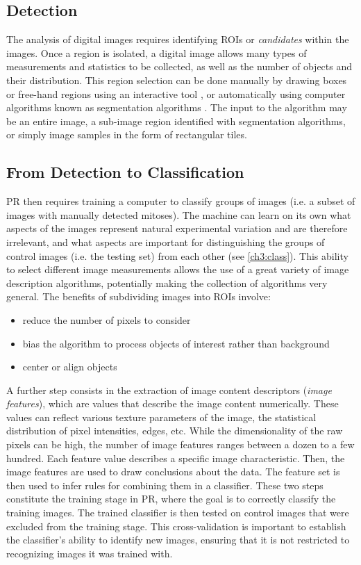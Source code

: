 \subsection{Detection}

The analysis of digital images requires identifying \Glspl{ROI} or \textit{candidates} within the images. Once a region is isolated,
a digital image allows many types of measurements and statistics to be collected, as well as the number of objects and their distribution.
This region selection can be done manually by drawing boxes or free-hand regions using an
interactive tool \cite{swedlow2009bioimage}, or automatically using
computer algorithms known as segmentation algorithms \cite{ljosa2009introduction}.
The input to the algorithm may be an entire image, a sub-image region identified with segmentation algorithms, or simply image samples
in the form of rectangular tiles.

\subsection{From Detection to Classification}

\Gls{PR} then requires training a computer to classify groups of images (i.e. a subset of images with manually detected mitoses).
The machine can learn on its own what aspects of the images represent natural experimental variation and are
therefore irrelevant, and what aspects are important for distinguishing the groups of
control images (i.e. the testing set) from each other (see \ref{ch3:class}).
This ability to select different image measurements  allows the use of a great
variety of image description algorithms, potentially making the collection of algorithms very general.
The benefits of subdividing images into \Glspl{ROI} involve:

\begin{itemize}
 \item reduce the number of pixels to consider
 \item bias the algorithm to process objects of interest rather than background
 \item center or align objects
\end{itemize}

A further step consists in the extraction of image content descriptors (\textit{image features}),
which are values that describe the image content numerically. These values can
reflect various texture parameters of the image, the statistical distribution of pixel intensities, edges, etc.
While the dimensionality of the raw pixels can be high, the number of image features ranges
between a dozen to a few hundred. Each feature value describes a specific image characteristic.
Then, the image features are used to draw conclusions about the data.
The feature set is then used to infer rules for combining them in a classifier.
These two steps constitute the training stage in PR, where the goal is to correctly
classify the training images. The trained classifier is then tested on control images
that were excluded from the training stage.
This cross-validation is important to establish the classifier's ability to identify
new images, ensuring that it is not restricted to recognizing images it was
trained with.

